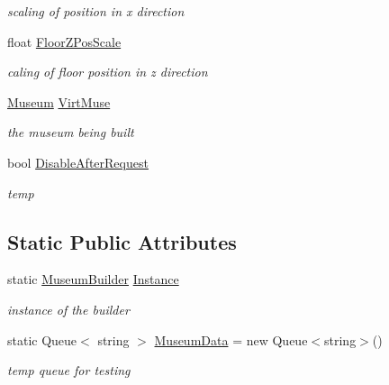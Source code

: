 \begin{DoxyCompactItemize}
\begin{DoxyCompactList}\small\item\em scaling of position in x direction \end{DoxyCompactList}\item 
float \mbox{\hyperlink{class_museum_builder_a221fec90b7a551d41df9a6593b649c51}{Floor\+Z\+Pos\+Scale}}
\begin{DoxyCompactList}\small\item\em caling of floor position in z direction \end{DoxyCompactList}\item 
\mbox{\hyperlink{class_museum}{Museum}} \mbox{\hyperlink{class_museum_builder_ab7844cfc1f0ff34cdea4ce425585b448}{Virt\+Muse}}
\begin{DoxyCompactList}\small\item\em the museum being built \end{DoxyCompactList}\item 
bool \mbox{\hyperlink{class_museum_builder_a13b0442ec3a7b4aededb9a7d90572c70}{Disable\+After\+Request}}
\begin{DoxyCompactList}\small\item\em temp \end{DoxyCompactList}\end{DoxyCompactItemize}
\subsection*{Static Public Attributes}
\begin{DoxyCompactItemize}
\item 
static \mbox{\hyperlink{class_museum_builder}{Museum\+Builder}} \mbox{\hyperlink{class_museum_builder_a072af37ad11eefd26fbac2f98e9414bf}{Instance}}
\begin{DoxyCompactList}\small\item\em instance of the builder \end{DoxyCompactList}\item 
static Queue$<$ string $>$ \mbox{\hyperlink{class_museum_builder_ab659e7b1adaace5d5c8dec90df493483}{Museum\+Data}} = new Queue$<$string$>$()
\begin{DoxyCompactList}\small\item\em temp queue for testing \end{DoxyCompactList}\end{DoxyCompactItemize}

